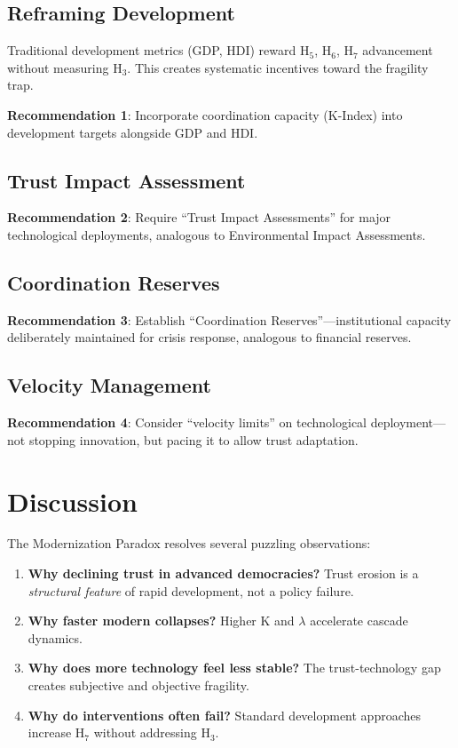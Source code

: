 \documentclass[11pt,a4paper]{article}
\begin{document}
\subsection{Reframing Development}

Traditional development metrics (GDP, HDI) reward H$_5$, H$_6$, H$_7$ advancement without measuring H$_3$. This creates systematic incentives toward the fragility trap.

\textbf{Recommendation 1}: Incorporate coordination capacity (K-Index) into development targets alongside GDP and HDI.

\subsection{Trust Impact Assessment}

\textbf{Recommendation 2}: Require ``Trust Impact Assessments'' for major technological deployments, analogous to Environmental Impact Assessments.

\subsection{Coordination Reserves}

\textbf{Recommendation 3}: Establish ``Coordination Reserves''---institutional capacity deliberately maintained for crisis response, analogous to financial reserves.

\subsection{Velocity Management}

\textbf{Recommendation 4}: Consider ``velocity limits'' on technological deployment---not stopping innovation, but pacing it to allow trust adaptation.

\section{Discussion}

The Modernization Paradox resolves several puzzling observations:

\begin{enumerate}
    \item \textbf{Why declining trust in advanced democracies?} Trust erosion is a \textit{structural feature} of rapid development, not a policy failure.

    \item \textbf{Why faster modern collapses?} Higher K and $\lambda$ accelerate cascade dynamics.

    \item \textbf{Why does more technology feel less stable?} The trust-technology gap creates subjective and objective fragility.

    \item \textbf{Why do interventions often fail?} Standard development approaches increase H$_7$ without addressing H$_3$.
\end{enumerate}
\end{document}
